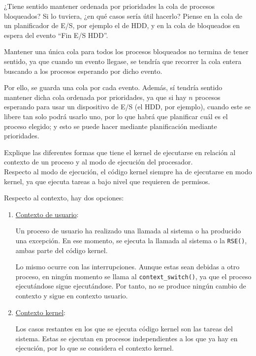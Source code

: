 \begin{ejercicio}
    ¿Tiene sentido mantener ordenada por prioridades la cola de procesos bloqueados? Si lo tuviera, ¿en qué casos sería útil hacerlo? Piense en la cola de un planificador de E/S, por ejemplo el de HDD, y en la cola de bloqueados en espera del evento ``Fin E/S HDD''.

    Mantener una única cola para todos los procesos bloqueados no termina de tener sentido, ya que cuando un evento llegase, se tendría que recorrer la cola entera buscando a los procesos esperando por dicho evento.
    
    Por ello, se guarda una cola por cada evento. Además, sí tendría sentido mantener dicha cola ordenada por prioridades, ya que si hay $n$ procesos esperando para usar un dispositivo de E/S (el HDD, por ejemplo), cuando este se libere tan solo podrá usarlo uno, por lo que habrá que planificar cuál es el proceso elegido; y esto se puede hacer mediante planificación mediante prioridades.
\end{ejercicio}

\begin{ejercicio}
    Explique las diferentes formas que tiene el kernel de ejecutarse en relación al contexto de un proceso y al modo de ejecución del procesador.\\

    Respecto al modo de ejecución, el código kernel siempre ha de ejecutarse en modo kernel, ya que ejecuta tareas a bajo nivel que requieren de permisos.

    Respecto al contexto, hay dos opciones:
    \begin{enumerate}
        \item \ul{Contexto de usuario}:

        Un proceso de usuario ha realizado una llamada al sistema o ha producido una excepción. En ese momento, se ejecuta la llamada al sistema o la \verb|RSE()|, ambas parte del código kernel.

        Lo mismo ocurre con las interrupciones. Aunque estas sean debidas a otro proceso, en ningún momento se llama al \verb|context_switch()|, ya que el proceso ejecutándose sigue ejecutándose. Por tanto, no se produce ningún cambio de contexto y sigue en contexto usuario. 

        \item \ul{Contexto kernel}:

        Los casos restantes en los que se ejecuta código kernel son las tareas del sistema. Estas se ejecutan en procesos independientes a los que ya hay en ejecución, por lo que se considera el contexto kernel.

        \begin{comment}
        Aunque el caso de las interrupciones pueda parecer que se trata de contexto de usuario; en realidad la interrupción se produce cuando se está ejecutando un programa ajeno a la interrupción; por lo que el contexto no es el del programa. 
        \end{comment}
    \end{enumerate}
\end{ejercicio}

